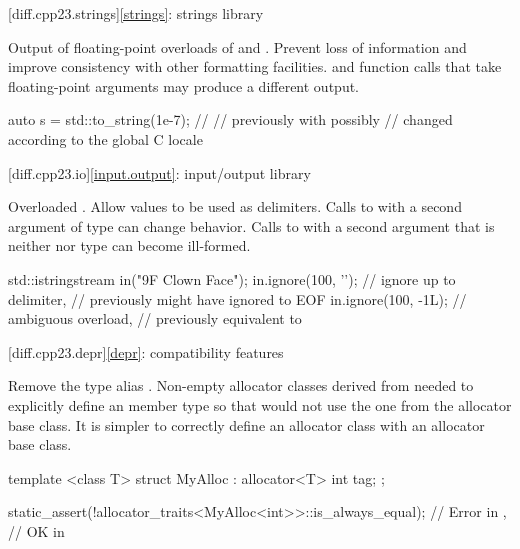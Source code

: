 [diff.cpp23.strings]{\ref*{strings}: strings library}

\change
Output of floating-point overloads of  and .
\rationale
Prevent loss of information and improve consistency with other formatting
facilities.
\effect
{} and  function calls that take
floating-point arguments may produce a different output.
\begin{example}
\begin{codeblock}
auto s = std::to_string(1e-7);  // 
                                // previously  with  possibly
                                // changed according to the global C locale
\end{codeblock}
\end{example}

[diff.cpp23.io]{\ref*{input.output}: input/output library}

\change
Overloaded .
\rationale
Allow  values to be used as delimiters.
\effect
Calls to  with a second argument of  type
can change behavior.
Calls to  with a second argument that is neither
 nor  type can become ill-formed.
\begin{example}
\begin{codeblock}
std::istringstream in("\x9F Clown Face");
in.ignore(100, '');     // ignore up to  delimiter,
                            // previously might have ignored to EOF
in.ignore(100, -1L);        // ambiguous overload,
                            // previously equivalent to 
\end{codeblock}
\end{example}

[diff.cpp23.depr]{\ref*{depr}: compatibility features}

\nodiffref
\change
Remove the type alias .
\rationale
Non-empty allocator classes derived from  needed to explicitly
define an  member type so that 
would not use the one from the allocator base class.
\effect
It is simpler to correctly define an allocator class with an allocator base
class.
\begin{example}
\begin{codeblock}
template <class T>
struct MyAlloc : allocator<T> {
  int tag;
};

static_assert(!allocator_traits<MyAlloc<int>>::is_always_equal);        // Error in \CppXXIII{},
                                                                        // OK in \CppXXVI{}
\end{codeblock}
\end{example}

